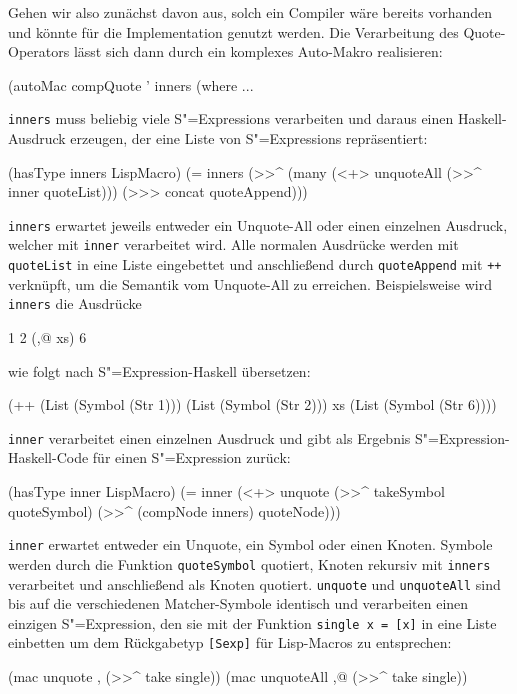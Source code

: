 \documentclass[11pt, a4paper, bibgerm]{scrbook}
\newcommand\icode[1]{\lstinline?#1?}
\newcommand{\sexp}{S"=Expression}
\newcommand{\sexps}{S"=Expressions}
\begin{document}
Gehen wir also zunächst davon aus, solch ein Compiler wäre bereits
vorhanden und könnte für die Implementation genutzt werden. Die
Verarbeitung des Quote-Operators lässt sich dann durch ein komplexes
Auto-Makro realisieren:
\begin{code}
(autoMac compQuote ' inners
  (where
    ...
\end{code}
\icode{inners} muss beliebig viele \sexps{} verarbeiten und daraus einen
Haskell-Ausdruck erzeugen, der eine Liste von \sexps{}
repräsentiert:
\begin{code}
    (hasType inners LispMacro)
    (= inners
       (>>^ (many (<+> unquoteAll 
                       (>>^ inner quoteList)))
            (>>> concat quoteAppend)))
\end{code}
\icode{inners} erwartet jeweils entweder ein Unquote-All oder einen
einzelnen Ausdruck, welcher mit \icode{inner} verarbeitet wird. Alle
normalen Ausdrücke werden mit \icode{quoteList} in eine Liste
eingebettet und anschließend durch \icode{quoteAppend} mit \icode{++}
verknüpft, um die Semantik vom Unquote-All zu erreichen. Beispielsweise
wird \icode{inners} die Ausdrücke 
\begin{code}
1 2 (,@ xs) 6  
\end{code}
wie folgt nach \sexp{}-Haskell übersetzen:
\begin{code}
(++ (List (Symbol (Str 1)))
    (List (Symbol (Str 2)))
    xs    
    (List (Symbol (Str 6))))
\end{code}
\icode{inner} verarbeitet einen einzelnen Ausdruck und gibt als Ergebnis
\sexp{}-Haskell-Code für einen \sexp{} zurück:
\begin{code}
    (hasType inner LispMacro)
    (= inner (<+> unquote    
                  (>>^ takeSymbol quoteSymbol)     
                  (>>^ (compNode inners) quoteNode)))
\end{code}
\icode{inner} erwartet entweder ein Unquote, ein Symbol oder einen
Knoten. Symbole werden durch die Funktion \icode{quoteSymbol} quotiert,
Knoten rekursiv mit \icode{inners} verarbeitet und anschließend als
Knoten quotiert. \icode{unquote} und \icode{unquoteAll} sind bis auf die
verschiedenen Matcher-Symbole identisch und verarbeiten einen einzigen
\sexp{}, den sie mit der Funktion \icode{single x = [x]} in eine Liste
einbetten um dem Rückgabetyp \icode{[Sexp]} für Lisp-Macros zu
entsprechen:
\begin{code}
    (mac unquote    ,  (>>^ take single))
    (mac unquoteAll ,@ (>>^ take single))
\end{code}
\end{document}
